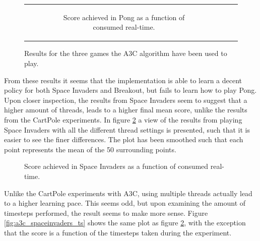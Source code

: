 \documentclass[11pt]{article}
\begin{document}
\begin{figure}[H]
\begin{tabular}[c]{ccc}
\begin{subfigure}[t]{.32\textwidth}
        \caption{Score achieved in Pong as a function of
        consumed real-time.}
    \end{subfigure}
  \end{tabular}
  \label{fig:all_atari}
  \caption{Results for the three games the A3C algorithm have been used to play.}
\end{figure}

From these results it seems that the implementation is able to learn
a decent policy for both Space Invaders and Breakout, but fails
to learn how to play Pong.
Upon closer inspection, the results from Space Invaders seem to suggest
that a higher amount of threads, leads to a higher final mean score,
unlike the results from the CartPole experiments.
In figure \ref{fig:a3c_spaceinvaders} a view of the results from
playing Space Invaders with all the different thread settings is presented,
such that it is easier to see the finer differences.
The plot has been smoothed such that each point represents the mean of the
50 surrounding points.

\begin{figure}[H]
    \caption{Score achieved in Space Invaders as a function of
    consumed real-time.}
    \label{fig:a3c_spaceinvaders}
\end{figure}

Unlike the CartPole experiments with A3C, using multiple threads
actually lead to a higher learning pace.
This seems odd, but upon examining the amount of timesteps performed,
the result seems to make more sense.
Figure \ref{fig:a3c_spaceinvaders_ts} shows the same plot as
figure \ref{fig:a3c_spaceinvaders}, with the
exception that the score is a function of the timesteps taken
during the experiment.
\end{document}
